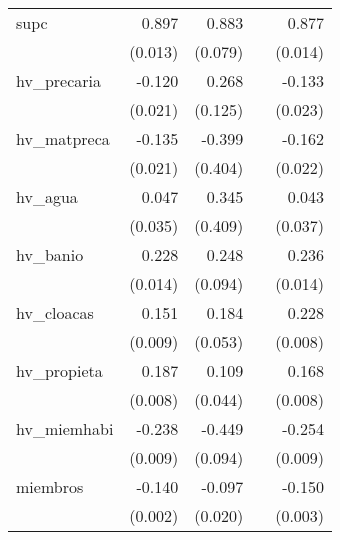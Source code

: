 {\begin{longtable}{l*{4}{D{.}{.}{-1}}}
\addlinespace
supc        &       0.897\sym{***}&       0.883\sym{***}&                     &       0.877\sym{***}\\
            &     (0.013)         &     (0.079)         &                     &     (0.014)         \\
\addlinespace
hv\_precaria &      -0.120\sym{***}&       0.268\sym{*}  &                     &      -0.133\sym{***}\\
            &     (0.021)         &     (0.125)         &                     &     (0.023)         \\
\addlinespace
hv\_matpreca &      -0.135\sym{***}&      -0.399         &                     &      -0.162\sym{***}\\
            &     (0.021)         &     (0.404)         &                     &     (0.022)         \\
\addlinespace
hv\_agua     &       0.047         &       0.345         &                     &       0.043         \\
            &     (0.035)         &     (0.409)         &                     &     (0.037)         \\
\addlinespace
hv\_banio    &       0.228\sym{***}&       0.248\sym{**} &                     &       0.236\sym{***}\\
            &     (0.014)         &     (0.094)         &                     &     (0.014)         \\
\addlinespace
hv\_cloacas  &       0.151\sym{***}&       0.184\sym{***}&                     &       0.228\sym{***}\\
            &     (0.009)         &     (0.053)         &                     &     (0.008)         \\
\addlinespace
hv\_propieta &       0.187\sym{***}&       0.109\sym{*}  &                     &       0.168\sym{***}\\
            &     (0.008)         &     (0.044)         &                     &     (0.008)         \\
\addlinespace
hv\_miemhabi &      -0.238\sym{***}&      -0.449\sym{***}&                     &      -0.254\sym{***}\\
            &     (0.009)         &     (0.094)         &                     &     (0.009)         \\
\addlinespace
miembros    &      -0.140\sym{***}&      -0.097\sym{***}&                     &      -0.150\sym{***}\\
            &     (0.002)         &     (0.020)         &                     &     (0.003)         \\

\end{longtable}}
